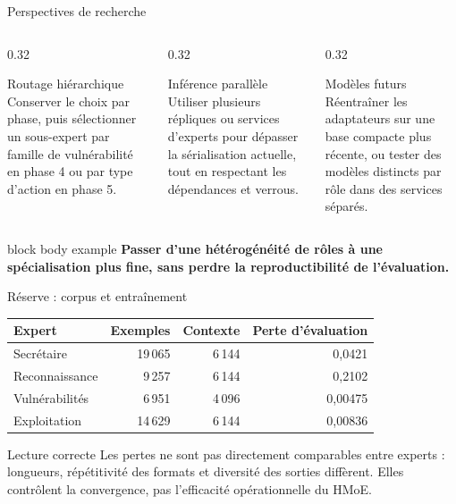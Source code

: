 \documentclass[aspectratio=169,10pt]{beamer}
\newcommand{\keymessage}[1]{%
  \begin{beamercolorbox}[rounded=true,sep=1.1ex,wd=\linewidth]{block body example}
    \centering\bfseries #1
  \end{beamercolorbox}
}
\begin{document}
\begin{frame}{Perspectives de recherche}
  \begin{columns}[T,onlytextwidth]
    \begin{column}{0.32\textwidth}
      \begin{block}{Routage hiérarchique}
        Conserver le choix par phase, puis sélectionner un sous-expert par famille
        de vulnérabilité en phase 4 ou par type d'action en phase 5.
      \end{block}
    \end{column}
    \begin{column}{0.32\textwidth}
      \begin{block}{Inférence parallèle}
        Utiliser plusieurs répliques ou services d'experts pour dépasser la
        sérialisation actuelle, tout en respectant les dépendances et verrous.
      \end{block}
    \end{column}
    \begin{column}{0.32\textwidth}
      \begin{block}{Modèles futurs}
        Réentraîner les adaptateurs sur une base compacte plus récente, ou tester
        des modèles distincts par rôle dans des services séparés.
      \end{block}
    \end{column}
  \end{columns}

  \vfill
  \keymessage{Passer d'une hétérogénéité de rôles à une spécialisation plus fine, sans perdre la reproductibilité de l'évaluation.}
\end{frame}

\appendix

\begin{frame}{Réserve : corpus et entraînement}
  \centering
  \small
  \begin{tabular}{lrrr}
    \toprule
    Expert & Exemples & Contexte & Perte d'évaluation \\
    \midrule
    Secrétaire & 19\,065 & 6\,144 & 0,0421 \\
    Reconnaissance & 9\,257 & 6\,144 & 0,2102 \\
    Vulnérabilités & 6\,951 & 4\,096 & 0,00475 \\
    Exploitation & 14\,629 & 6\,144 & 0,00836 \\
    \bottomrule
  \end{tabular}

  \vspace{1em}
  \begin{alertblock}{Lecture correcte}
    Les pertes ne sont pas directement comparables entre experts : longueurs,
    répétitivité des formats et diversité des sorties diffèrent. Elles contrôlent
    la convergence, pas l'efficacité opérationnelle du HMoE.
  \end{alertblock}
\end{frame}
\end{document}
